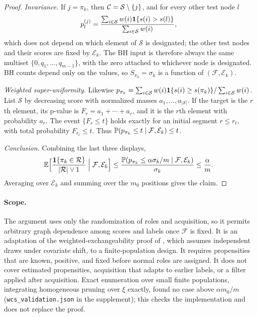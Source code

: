\begin{proof}
\emph{Invariance.} If $j=\pi_k$, then $\mathcal{C}=\mathcal S\setminus\{j\}$, and for every other test node $l$
\[
p_l^{(j)}=\frac{\sum_{i\in\mathcal S}w(i)\mathbf{1}\{s(i)>s(l)\}}{\sum_{i\in\mathcal S}w(i)},
\]
which does not depend on which element of $\mathcal S$ is designated; the other test nodes and their scores are fixed by $\mathcal E_k$. The BH input is therefore always the same multiset $\{0,q_1,\ldots,q_{m-1}\}$, with the zero attached to whichever node is designated. BH counts depend only on the values, so $S_{\pi_k}=\sigma_k$ is a function of $(\mathcal F,\mathcal E_k)$.

\emph{Weighted super-uniformity.} Likewise $p_{\pi_k}=\sum_{i\in\mathcal S}w(i)\mathbf{1}\{s(i)\ge s(\pi_k)\}/\sum_{i\in\mathcal S}w(i)$. List $\mathcal S$ by decreasing score with normalized masses $a_1,\ldots,a_{|\mathcal S|}$. If the target is the $r$th element, its p-value is $F_r=a_1+\cdots+a_r$, and it is the $r$th element with probability $a_r$. The event $\{F_r\le t\}$ holds exactly for an initial segment $r\le r_t$, with total probability $F_{r_t}\le t$. Thus $\mathbb{P}(p_{\pi_k}\le t\mid\mathcal F,\mathcal E_k)\le t$.

\emph{Conclusion.} Combining the last three displays,
\[
\mathbb{E}\Bigl[\frac{\mathbf{1}\{\pi_k\in\mathcal R\}}{|\mathcal R|\vee1}\Bigm|\mathcal F,\mathcal E_k\Bigr]
\le\frac{\mathbb{P}(p_{\pi_k}\le\alpha\sigma_k/m\mid\mathcal F,\mathcal E_k)}{\sigma_k}\le\frac{\alpha}{m}.
\]
Averaging over $\mathcal E_k$ and summing over the $m_0$ positions gives the claim.
\end{proof}

\paragraph{Scope.}
The argument uses only the randomization of roles and acquisition, so it permits arbitrary graph dependence among scores and labels once $\mathcal F$ is fixed. It is an adaptation of the weighted-exchangeability proof of \citet{jin2026weighted}, which assumes independent draws under covariate shift, to a finite-population design. It requires propensities that are known, positive, and fixed before normal roles are assigned. It does not cover estimated propensities, acquisition that adapts to earlier labels, or a filter applied after acquisition. Exact enumeration over small finite populations, integrating homogeneous pruning over $\xi$ exactly, found no case above $\alpha m_0/m$ (\texttt{wcs\_validation.json} in the supplement); this checks the implementation and does not replace the proof.

